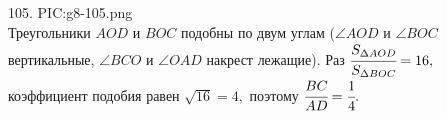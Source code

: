 105. {{PIC:g8-105.png}}\\
Треугольники $AOD$ и $BOC$ подобны по двум углам ($\angle AOD$ и $\angle BOC$ вертикальные, $\angle BCO$ и $\angle OAD$ накрест лежащие). Раз
$\cfrac{S_{\Delta AOD}}{S_{\Delta BOC}}=16,$ коэффициент подобия равен $\sqrt{16}=4,$ поэтому $\cfrac{BC}{AD}=\cfrac{1}{4}.$\\
